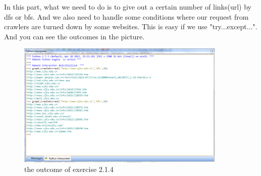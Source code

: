 \documentclass{article}
\begin{document}
In this part, what we need to do is to give out a certain number of links(url) by dfs or bfs. And we also need to handle some conditions where our request from crawlers are turned down by some websites. This is easy if we use "try...except...". And you can see the outcomes in the picture.\\
\begin{figure}[htbp]
\centering
\includegraphics[width=10cm]{4.png}
\caption{the outcome of exercise 2.1.4}
\end{figure}
\end{document}
